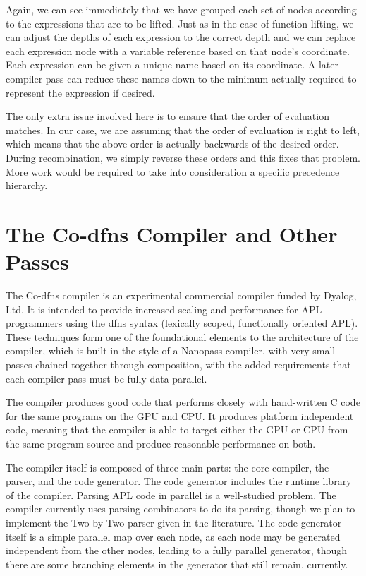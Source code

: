 \documentclass[numbers,preprint]{sigplanconf}
\begin{document}
Again, we can see immediately that we have grouped each set of nodes
according to the expressions that are to be lifted. Just as in the
case of function lifting, we can adjust the depths of each expression
to the correct depth and we can replace each expression node with a
variable reference based on that node’s coordinate. Each expression
can be given a unique name based on its coordinate. A later compiler
pass can reduce these names down to the minimum actually required to
represent the expression if desired.

The only extra issue involved here is to ensure that the order of
evaluation matches. In our case, we are assuming that the order of
evaluation is right to left, which means that the above order is
actually backwards of the desired order. During recombination, we
simply reverse these orders and this fixes that problem. More work
would be required to take into consideration a specific precedence
hierarchy.

\section{The Co-dfns Compiler and Other Passes}

The Co-dfns compiler is an experimental commercial compiler funded by 
Dyalog, Ltd. \cite{hsu2014co,hsu2015accelerating}
It is intended to provide increased scaling and performance
for APL programmers using the dfns syntax (lexically scoped, functionally 
oriented APL). These techniques form one of the foundational elements to 
the architecture of the compiler, which is built in the style of a Nanopass 
\cite{keep2013nanopass}
compiler, with very small passes chained together through composition, with 
the added requirements that each compiler pass must be fully data parallel. 

The compiler produces good code that performs closely with hand-written 
C code for the same programs on the GPU and CPU. It produces platform 
independent code, meaning that the compiler is able to target either the 
GPU or CPU from the same program source and produce reasonable performance 
on both. 

The compiler itself is composed of three main parts: the core compiler, 
the parser, and the code generator. The code generator includes the runtime 
library of the compiler. Parsing APL code in parallel is a well-studied 
problem. The compiler currently uses parsing combinators to do its parsing, 
though we plan to implement the Two-by-Two parser given in the literature. 
The code generator itself is a simple parallel map over each node, as 
each node may be generated independent from the other nodes, leading to a 
fully parallel generator, though there are some branching elements in the 
generator that still remain, currently. 
\end{document}

